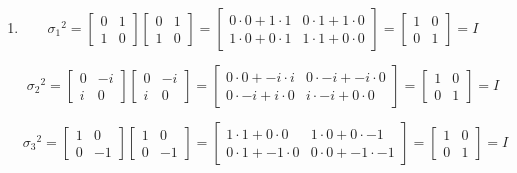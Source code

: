\documentclass[12pt]{article}
\begin{document}
\begin{enumerate}
\item
\begin{equation}
{\sigma_1}^2 =
\begin{bmatrix}
0 & 1\\
1 & 0
\end{bmatrix}
\begin{bmatrix}
0 & 1\\
1 & 0
\end{bmatrix}
=
\begin{bmatrix}
0\cdot 0 + 1\cdot 1 & 0\cdot 1 + 1\cdot 0\\
1\cdot 0 + 0\cdot 1 & 1\cdot 1 + 0\cdot 0
\end{bmatrix}
=
\begin{bmatrix}
1 & 0\\
0 & 1
\end{bmatrix}
= I
\end{equation}

\begin{equation}
{\sigma_2}^2 =
\begin{bmatrix}
0 & -i\\
i & 0
\end{bmatrix}
\begin{bmatrix}
0 & -i\\
i & 0
\end{bmatrix}
=
\begin{bmatrix}
0\cdot 0 + -i\cdot i & 0\cdot -i + -i\cdot 0\\
0\cdot -i + i\cdot 0 & i\cdot -i + 0\cdot0
\end{bmatrix}
=
\begin{bmatrix}
1 & 0\\
0 & 1
\end{bmatrix}
= I
\end{equation}

\begin{equation}
{\sigma_3}^2 =
\begin{bmatrix}
1 & 0\\
0 & -1
\end{bmatrix}
\begin{bmatrix}
1 & 0\\
0 & -1
\end{bmatrix}
=
\begin{bmatrix}
1\cdot 1 + 0\cdot 0 & 1\cdot 0 + 0\cdot -1\\
0\cdot 1 + -1 \cdot 0 & 0\cdot 0 + -1\cdot -1
\end{bmatrix}
=
\begin{bmatrix}
1 & 0\\
0 & 1
\end{bmatrix}
= I
\end{equation}


\end{enumerate}
\end{document}
